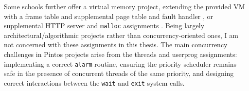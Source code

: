 Some schools further offer a virtual memory project, extending the provided VM with a frame table and supplemental page table and fault handler \cite{standford-cs140,uchicago-cs230}, or supplemental HTTP server and {\tt malloc} assignments \cite{berkeley-cs162}.
Being largely architectural/algorithmic projects rather than concurrency-oriented ones, I am not concerned with these assignments in this thesis.
The main concurrency challenges in Pintos projects arise from the threads and userprog assignments:
implementing a correct {\tt alarm} routine,
ensuring the priority scheduler remains safe in the presence of concurrent threads of the same priority,
and designing correct interactions between the {\tt wait} and {\tt exit} system calls.
